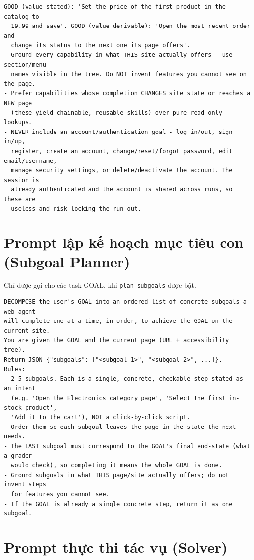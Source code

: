 \begin{lstlisting}[style=mystyle,numbers=none,basicstyle=\scriptsize\ttfamily]
  GOOD (value stated): 'Set the price of the first product in the catalog to
  19.99 and save'. GOOD (value derivable): 'Open the most recent order and
  change its status to the next one its page offers'.
- Ground every capability in what THIS site actually offers - use section/menu
  names visible in the tree. Do NOT invent features you cannot see on the page.
- Prefer capabilities whose completion CHANGES site state or reaches a NEW page
  (these yield chainable, reusable skills) over pure read-only lookups.
- NEVER include an account/authentication goal - log in/out, sign in/up,
  register, create an account, change/reset/forgot password, edit email/username,
  manage security settings, or delete/deactivate the account. The session is
  already authenticated and the account is shared across runs, so these are
  useless and risk locking the run out.
\end{lstlisting}

\section{Prompt lập kế hoạch mục tiêu con (Subgoal Planner)}
\label{app:prompt-planner}

Chỉ được gọi cho các task GOAL, khi \texttt{plan\_subgoals} được bật.

\begin{lstlisting}[style=mystyle,numbers=none,basicstyle=\scriptsize\ttfamily]
DECOMPOSE the user's GOAL into an ordered list of concrete subgoals a web agent
will complete one at a time, in order, to achieve the GOAL on the current site.
You are given the GOAL and the current page (URL + accessibility tree).
Return JSON {"subgoals": ["<subgoal 1>", "<subgoal 2>", ...]}.
Rules:
- 2-5 subgoals. Each is a single, concrete, checkable step stated as an intent
  (e.g. 'Open the Electronics category page', 'Select the first in-stock product',
  'Add it to the cart'), NOT a click-by-click script.
- Order them so each subgoal leaves the page in the state the next needs.
- The LAST subgoal must correspond to the GOAL's final end-state (what a grader
  would check), so completing it means the whole GOAL is done.
- Ground subgoals in what THIS page/site actually offers; do not invent steps
  for features you cannot see.
- If the GOAL is already a single concrete step, return it as one subgoal.
\end{lstlisting}

\section{Prompt thực thi tác vụ (Solver)}
\label{app:prompt-solver}

